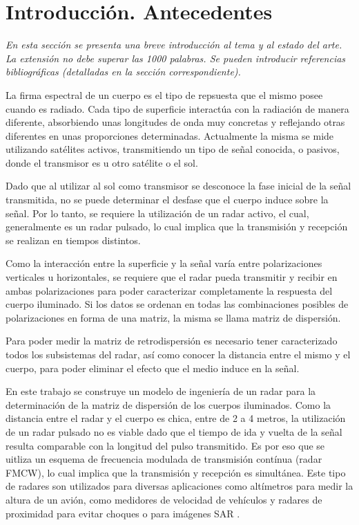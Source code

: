 \chapter{Introducción. Antecedentes} \label{ch:introduction}

\textit{En esta sección se presenta una breve introducción al tema y al estado del arte. La extensión no debe superar las 1000 palabras.
Se pueden introducir referencias bibliográficas (detalladas en la sección correspondiente).}

La firma espectral de un cuerpo es el tipo de repsuesta que el mismo posee cuando es radiado. Cada tipo de superficie interactúa con la radiación de manera diferente, absorbiendo unas longitudes de onda muy concretas y reflejando otras diferentes en unas proporciones determinadas. Actualmente la misma se mide utilizando satélites activos, transmitiendo un tipo de señal conocida, o pasivos, donde el transmisor es u otro satélite o el sol. 

Dado que al utilizar al sol como transmisor se desconoce la fase inicial de la señal transmitida, no se puede determinar el desfase que el cuerpo induce sobre la señal. Por lo tanto, se requiere la utilización de un radar activo, el cual, generalmente es un radar pulsado, lo cual implica que la transmisión y recepción se realizan en tiempos distintos.

Como la interacción entre la superficie y la señal varía entre polarizaciones verticales u horizontales, se requiere que el radar pueda transmitir y recibir en ambas polarizaciones para poder caracterizar completamente la respuesta del cuerpo iluminado. Si los datos se ordenan en todas las combinaciones posibles de polarizaciones en forma de una matriz, la misma se llama matriz de dispersión.

Para poder medir la matriz de retrodispersión es necesario tener caracterizado todos los subsistemas del radar, así como conocer la distancia entre el mismo y el cuerpo, para poder eliminar el efecto que el medio induce en la señal. 

En este trabajo se construye un modelo de ingeniería de un radar para la determinación de la matriz de dispersión de los cuerpos iluminados. Como la distancia entre el radar y el cuerpo es chica, entre de 2 a 4 metros, la utilización de un radar pulsado no es viable dado que el tiempo de ida y vuelta de la señal resulta comparable con la longitud del pulso transmitido. Es por eso que se uitliza un esquema de frecuencia modulada de transmisión contínua (radar FMCW), lo cual implica que la transmisión y recepción es simultánea. Este tipo de radares son utilizados para diversas aplicaciones como altímetros para medir la altura de un avión, como medidores de velocidad de vehículos y radares de proximidad para evitar choques o para imágenes SAR \cite{Richards2010}. 

